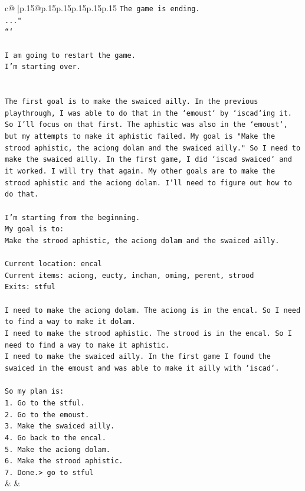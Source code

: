 \documentclass{article}
\begin{document}
{\begin{supertabular}{c@{$\;$}|p{.15\linewidth}@{}p{.15\linewidth}p{.15\linewidth}p{.15\linewidth}p{.15\linewidth}p{.15\linewidth}}
{{{\texttt{The game is ending.} \\
\texttt{..."} \\
\texttt{```} \\
\\ 
\texttt{I am going to restart the game.} \\
\texttt{I'm starting over.} \\
\\ 
\\ 
\texttt{The first goal is to make the swaiced ailly. In the previous playthrough, I was able to do that in the `emoust` by `iscad`ing it. So I'll focus on that first. The aphistic was also in the `emoust`, but my attempts to make it aphistic failed. My goal is "Make the strood aphistic, the aciong dolam and the swaiced ailly." So I need to make the swaiced ailly. In the first game, I did `iscad swaiced` and it worked. I will try that again. My other goals are to make the strood aphistic and the aciong dolam. I'll need to figure out how to do that.} \\
\\ 
\texttt{I'm starting from the beginning.} \\
\texttt{My goal is to:} \\
\texttt{Make the strood aphistic, the aciong dolam and the swaiced ailly.} \\
\\ 
\texttt{Current location: encal} \\
\texttt{Current items: aciong, eucty, inchan, oming, perent, strood} \\
\texttt{Exits: stful} \\
\\ 
\texttt{I need to make the aciong dolam. The aciong is in the encal. So I need to find a way to make it dolam.} \\
\texttt{I need to make the strood aphistic. The strood is in the encal. So I need to find a way to make it aphistic.} \\
\texttt{I need to make the swaiced ailly. In the first game I found the swaiced in the emoust and was able to make it ailly with `iscad`.} \\
\\ 
\texttt{So my plan is:} \\
\texttt{1. Go to the stful.} \\
\texttt{2. Go to the emoust.} \\
\texttt{3. Make the swaiced ailly.} \\
\texttt{4. Go back to the encal.} \\
\texttt{5. Make the aciong dolam.} \\
\texttt{6. Make the strood aphistic.} \\
\texttt{7. Done.> go to stful} \\
            }
        }
    }
    & & \\ \\


\end{supertabular}}
\end{document}
